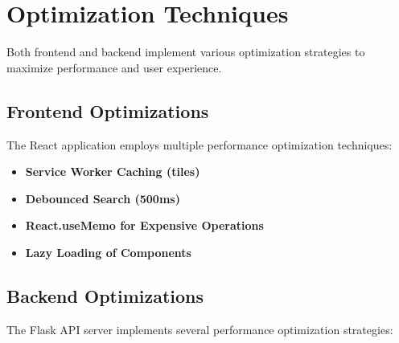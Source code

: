 \section{Optimization Techniques}

Both frontend and backend implement various optimization strategies to maximize performance and user experience.

\subsection{Frontend Optimizations}

The React application employs multiple performance optimization techniques:

\begin{itemize}
    \item \textbf{Service Worker Caching (tiles)}%
    
    \item \textbf{Debounced Search (500ms)}%
    
    \item \textbf{React.useMemo for Expensive Operations}%
    
    \item \textbf{Lazy Loading of Components}%
\end{itemize}

\subsection{Backend Optimizations}

The Flask API server implements several performance optimization strategies:

